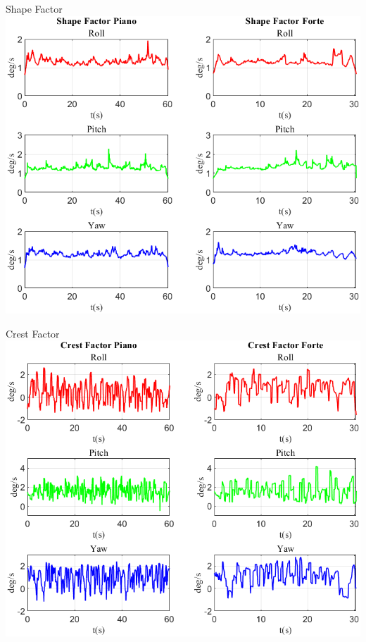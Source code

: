 	\begin{frame}{{Shape Factor}}
		\centering\includegraphics[height=.8\textheight]{figure/VAng/Shape Factor}
	\end{frame}
	
	\begin{frame}{{Crest Factor}}
		\centering\includegraphics[height=.8\textheight]{figure/VAng/Crest Factor}
	\end{frame}
	
